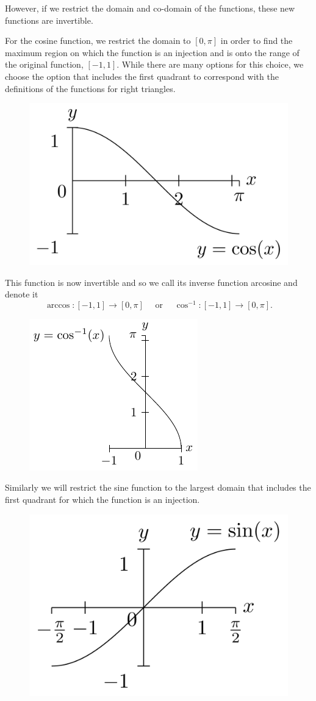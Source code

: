 \documentclass[
]{book}
\theoremstyle{definition}
\theoremstyle{definition}
\theoremstyle{definition}
\theoremstyle{definition}
\theoremstyle{remark}
\begin{document}
However, if we restrict the domain and co-domain of the functions, these new functions are invertible.

For the cosine function, we restrict the domain to \([0,\pi]\) in order to find the maximum region on which the function is an injection and is onto the range of the original function, \([-1,1]\). While there are many options for this choice, we choose the option that includes the first quadrant to correspond with the definitions of the functions for right triangles.

\begin{figure}

{\centering \includegraphics[width=0.4\linewidth]{tikz/cosine-graph-restricted} 

}

\end{figure}

This function is now invertible and so we call its inverse function arcosine and denote it
\[\arccos:[-1,1]\rightarrow [0,\pi] \quad \mbox{ or } \quad  \cos^{-1}:[-1,1]\rightarrow [0,\pi].\]

\begin{figure}

{\centering \includegraphics[width=0.4\linewidth]{tikz/arccos} 

}

\end{figure}

Similarly we will restrict the sine function to the largest domain that includes the first quadrant for which the function is an injection.

\begin{figure}

{\centering \includegraphics[width=0.4\linewidth]{tikz/sine-graph-restricted} 

}

\end{figure}
\end{document}

